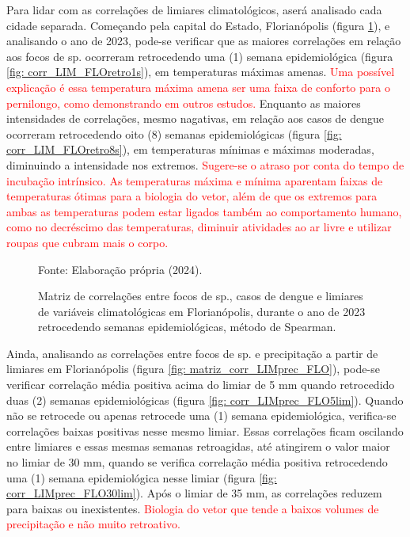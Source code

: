 \documentclass[
	12pt,				%
	openright,			%
	oneside,			%
	a4paper,			%
	english,			%
	french,				%
	spanish,			%
	brazil				%
	dvipsnames, table]{abntex2}
\begin{document}
\indent Para lidar com as correlações de limiares climatológicos, aserá analisado cada cidade separada. Começando pela capital do Estado, Florianópolis (figura \ref{fig: matriz_corr_LIM_FLOretro}), e analisando o ano de 2023, pode-se verificar que as maiores correlações em relação aos focos de  sp. ocorreram retrocedendo uma (1) semana epidemiológica (figura \ref{fig: corr_LIM_FLOretro1s}), em temperaturas máximas amenas. \textcolor{red}{Uma possível explicação é essa temperatura máxima amena ser uma faixa de conforto para o pernilongo, como demonstrando em outros estudos.} Enquanto as maiores intensidades de correlações, mesmo nagativas, em relação aos casos de dengue ocorreram retrocedendo oito (8) semanas epidemiológicas (figura \ref{fig: corr_LIM_FLOretro8s}), em temperaturas mínimas e máximas moderadas, diminuindo a intensidade nos extremos. \textcolor{red}{Sugere-se o atraso por conta do tempo de incubação intrínsico. As temperaturas máxima e mínima aparentam faixas de temperaturas ótimas para a biologia do vetor, além de que os extremos para ambas as temperaturas podem estar ligados também ao comportamento humano, como no decréscimo das temperaturas, diminuir atividades ao ar livre e utilizar roupas que cubram mais o corpo.}

\begin{figure}[htbp]
    \begin{center}
    \caption{Matriz de correlações entre focos de  sp., casos de dengue e limiares de variáveis climatológicas em Florianópolis, durante o ano de 2023 retrocedendo semanas epidemiológicas, método de Spearman.}
    \label{fig: matriz_corr_LIM_FLOretro}
        \hfill
    \end{center}
    \small{Fonte: Elaboração própria (2024).}
\end{figure}

Ainda, analisando as correlações entre focos de  sp. e precipitação a partir de limiares em Florianópolis (figura \ref{fig: matriz_corr_LIMprec_FLO}), pode-se verificar correlação média positiva acima do limiar de 5 mm quando retrocedido duas (2) semanas epidemiológicas (figura \ref{fig: corr_LIMprec_FLO5lim}). Quando não se retrocede ou apenas retrocede uma (1) semana epidemiológica, verifica-se correlações baixas positivas nesse mesmo limiar. Essas correlações ficam oscilando entre limiares e essas mesmas semanas retroagidas, até atingirem o valor maior no limiar de 30 mm, quando se verifica correlação média positiva retrocedendo uma (1) semana epidemiológica nesse limiar (figura \ref{fig: corr_LIMprec_FLO30lim}). Após o limiar de 35 mm, as correlações reduzem para baixas ou inexistentes. \textcolor{red}{Biologia do vetor que tende a baixos volumes de precipitação e não muito retroativo.}
\end{document}
